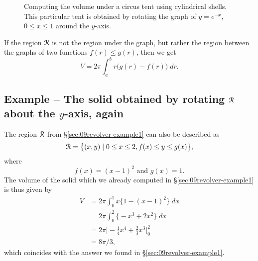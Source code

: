 \begin{figure}[t]\centering
  
  \parbox{175pt}{ }
  \parbox{175pt}{ }
  
  \caption{Computing the volume under a circus tent using cylindrical shells.
    This particular tent is obtained by rotating the graph of $y=e^{-x}$, $0\le
    x\le 1$ around the $y$-axis.}
  \label{fig:09cylindricalshells}
\end{figure}

If the region $\mathcal{R}$ is not the region under the graph, but rather the region
between the graphs of two functions $f(r)\leq g(r)$, then we get
\[
V = 2\pi\int_a^b r\bigl(g(r) - f(r)\bigr) \;dr.
\]

\subsection{Example -- The solid obtained by rotating $\mathcal{R}$ about the $y$-axis, again} %
The region $\mathcal{R}$ from \S\ref{sec:09revolver-example1} can also be described as
\[
\mathcal{R} = \bigl\{(x, y) \mid 0\leq x\leq 2, f(x)\leq y\leq g(x)\bigr\},
\]
where
\[
f(x) = (x-1)^2\text{ and }g(x) = 1.
\]
The volume of the solid which we already computed in
\S\ref{sec:09revolver-example1} is thus given by
\begin{align*}
  V &= 2\pi \int_0^1 x\bigl\{1-(x-1)^2\bigr\}\;dx\\
  &= 2\pi \int_0^2 \bigl\{-x^3+2x^2\bigr\}\;dx\\
  &= 2\pi\bigl[-\tfrac14x^4+\tfrac23x^3\bigr]_0^2\\
  &= 8\pi/3,
\end{align*}
which coincides with the answer we found in \S\ref{sec:09revolver-example1}.




